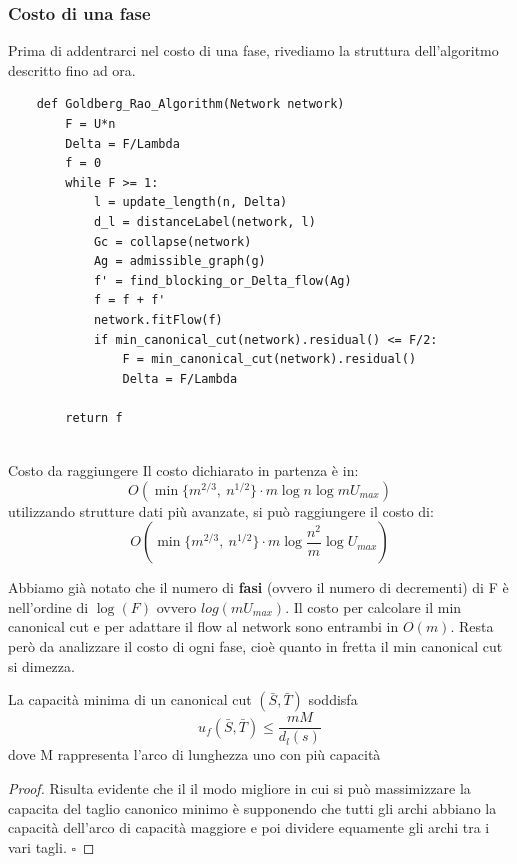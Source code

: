 \documentclass[a4paper, 11pt]{report}
\newcommand*{\QED}{\null\nobreak\hfill\ensuremath{\square}}%
\begin{document}
    \subsubsection{Costo di una fase}
    Prima di addentrarci nel costo di una fase, rivediamo la struttura dell'algoritmo descritto fino ad ora.
    \begin{verbatim}
    def Goldberg_Rao_Algorithm(Network network)
        F = U*n
        Delta = F/Lambda
        f = 0
        while F >= 1:
            l = update_length(n, Delta)
            d_l = distanceLabel(network, l)
            Gc = collapse(network)
            Ag = admissible_graph(g)
            f' = find_blocking_or_Delta_flow(Ag)
            f = f + f'
            network.fitFlow(f)
            if min_canonical_cut(network).residual() <= F/2: 
                F = min_canonical_cut(network).residual()
                Delta = F/Lambda

        return f
        
    \end{verbatim}
    \begin{remark}
        {Costo da raggiungere}{}
        Il costo dichiarato in partenza è in:
        \[O(\min \{m^{2/3},\ n^{1/2}\}\cdot m \log n\log m U_{max})\]
        utilizzando strutture dati più avanzate, si può raggiungere il costo di:
        \[O(\min \{m^{2/3},\ n^{1/2}\}\cdot m \log \frac{n^2}{m}\log U_{max})\]

    \end{remark}
    Abbiamo già notato che il numero di \textbf{fasi} (ovvero il numero di decrementi) di F è nell'ordine di $\log(F)$ ovvero $log(m U_{max})$.
    Il costo per calcolare il min canonical cut e per adattare il flow al network sono entrambi in $O(m)$.
    Resta però da analizzare il costo di ogni fase, cioè quanto in fretta il min canonical cut si dimezza.
    \begin{lemma}
        {}{}
        La capacità minima di un canonical cut $(\bar{S}, \bar{T})$ soddisfa
        \[u_f(\bar{S}, \bar{T})\le \frac{mM}{d_l(s)}\]
        dove M rappresenta l'arco di lunghezza uno con più capacità
    \end{lemma}
    \begin{proof}
        Risulta evidente che il il modo migliore in cui si può massimizzare la capacita del taglio canonico minimo è supponendo che tutti gli archi abbiano la capacità dell'arco di capacità maggiore e poi dividere equamente gli archi tra i vari tagli.
    \QED
    \end{proof}
\end{document}
